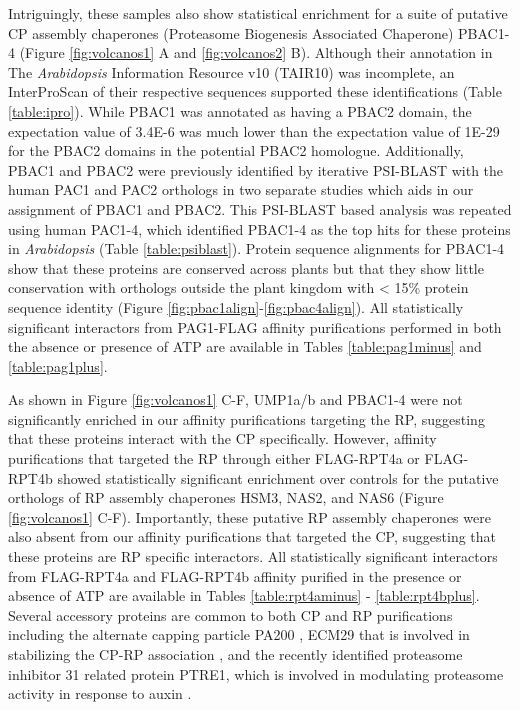 Intriguingly, these samples also show statistical enrichment for a suite of putative CP assembly chaperones (Proteasome Biogenesis Associated Chaperone) PBAC1-4 (Figure \ref{fig:volcanos1} A and \ref{fig:volcanos2} B). Although their annotation in The \textit{Arabidopsis} Information Resource v10 (TAIR10) was incomplete, an InterProScan of their respective sequences supported these identifications (Table \ref{table:ipro}). While PBAC1 was annotated as having a PBAC2 domain, the expectation value of 3.4E-6 was much lower than the expectation value of 1E-29 for the PBAC2 domains in the potential PBAC2 homologue. Additionally, PBAC1 and PBAC2 were previously identified by iterative PSI-BLAST with the human PAC1 and PAC2 orthologs in two separate studies \citep{kusmierczyk11, le07} which aids in our assignment of PBAC1 and PBAC2. This PSI-BLAST based analysis was repeated using human PAC1-4, which identified PBAC1-4 as the top hits for these proteins in \textit{Arabidopsis} (Table \ref{table:psiblast}). Protein sequence alignments for PBAC1-4 show that these proteins are conserved across plants but that they show little conservation with orthologs outside the plant kingdom with < 15\% protein sequence identity (Figure \ref{fig:pbac1align}-\ref{fig:pbac4align}).  All statistically significant interactors from PAG1-FLAG affinity purifications performed in both the absence or presence of ATP are available in Tables \ref{table:pag1minus} and \ref{table:pag1plus}.

As shown in Figure \ref{fig:volcanos1} C-F, UMP1a/b and PBAC1-4 were not significantly enriched in our affinity purifications targeting the RP, suggesting that these proteins interact with the CP specifically. However, affinity purifications that targeted the RP through either FLAG-RPT4a or FLAG-RPT4b showed statistically significant enrichment over controls for the putative orthologs of RP assembly chaperones HSM3, NAS2, and NAS6 (Figure \ref{fig:volcanos1} C-F). Importantly, these putative RP assembly chaperones were also absent from our affinity purifications that targeted the CP, suggesting that these proteins are RP specific interactors. All statistically significant interactors from FLAG-RPT4a and FLAG-RPT4b affinity purified in the presence or absence of ATP are available in Tables \ref{table:rpt4aminus} - \ref{table:rpt4bplus}. Several accessory proteins are common to both CP and RP purifications including the alternate capping particle PA200 \citep{book10}, ECM29 that is involved in stabilizing the CP-RP association \citep{lehmann10}, and the recently identified proteasome inhibitor 31 related protein PTRE1, which is involved in modulating proteasome activity in response to auxin \citep{yang16}. 

